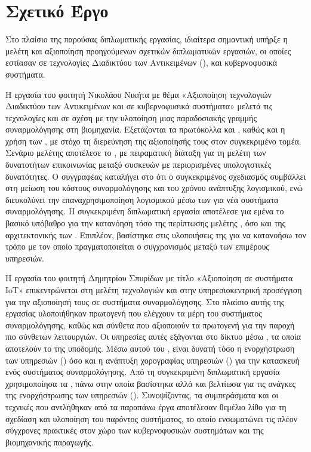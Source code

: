\section{Σχετικό Έργο}
Στο πλαίσιο της παρούσας διπλωματικής εργασίας, ιδιαίτερα σημαντική υπήρξε η μελέτη και αξιοποίηση προηγούμενων
σχετικών διπλωματικών εργασιών, οι οποίες εστίασαν σε τεχνολογίες Διαδικτύου των Αντικειμένων (),
 και κυβερνοφυσικά συστήματα.

Η εργασία του φοιτητή Νικολάου Νικήτα με θέμα «Αξιοποίηση τεχνολογιών Διαδικτύου των Αντικειμένων και 
σε κυβερνοφυσικά συστήματα» μελετά τις τεχνολογίες  και  σε σχέση με την υλοποίηση μιας παραδοσιακής
γραμμής συναρμολόγησης στη βιομηχανία. Εξετάζονται τα πρωτόκολλα  και , καθώς και η χρήση
των , με στόχο τη διερεύνηση της αξιοποίησής τους στον συγκεκριμένο τομέα. Σενάριο μελέτης
αποτέλεσε το , με πειραματική διάταξη για τη μελέτη των δυνατοτήτων επικοινωνίας
μεταξύ συσκευών με περιορισμένες υπολογιστικές δυνατότητες. Ο συγγραφέας καταλήγει στο ότι ο συγκεκριμένος σχεδιασμός
συμβάλλει στη μείωση του κόστους συναρμολόγησης και του χρόνου ανάπτυξης λογισμικού, ενώ διευκολύνει την
επαναχρησιμοποίηση λογισμικού μέσω των  για νέα συστήματα συναρμολόγησης.
Η συγκεκριμένη διπλωματική εργασία αποτέλεσε για εμένα το βασικό υπόβαθρο για την κατανόηση τόσο της περίπτωσης μελέτης
, όσο και της αρχιτεκτονικής των . Επιπλέον, βασίστηκα στις υλοποιήσεις της για να κατανοήσω
τον τρόπο με τον οποίο πραγματοποιείται ο συγχρονισμός μεταξύ των επιμέρους υπηρεσιών.

Η εργασία του φοιτητή Δημητρίου Σπυρίδων με τίτλο «Αξιοποίηση  σε συστήματα IoT»
επικεντρώνεται στη μελέτη τεχνολογιών  και στην υπηρεσιοκεντρική προσέγγιση για την αξιοποίησή τους σε
συστήματα συναρμολόγησης. Στο πλαίσιο αυτής της εργασίας υλοποιήθηκαν πρωτογενή  που
ελέγχουν τα μέρη του συστήματος συναρμολόγησης, καθώς και σύνθετα  που αξιοποιούν
τα πρωτογενή για την παροχή πιο σύνθετων λειτουργιών. Οι υπηρεσίες αυτές εξάγονται στο δίκτυο μέσω  ,
τα οποία αποτελούν το  της υποδομής. Μέσω αυτού του , είναι δυνατή τόσο η ενορχήστρωση των
υπηρεσιών () όσο και η ανάπτυξη χορογραφίας υπηρεσιών ()
για την κατασκευή ενός συστήματος συναρμολόγησης. Από τη συγκεκριμένη διπλωματική εργασία χρησιμοποίησα τα ,
πάνω στην οποία βασίστηκα αλλά και βελτίωσα για τις ανάγκες της
ενορχήστρωσης των υπηρεσιών ().
Συνοψίζοντας, τα συμπεράσματα και οι τεχνικές που αντλήθηκαν από τα παραπάνω έργα αποτέλεσαν θεμέλιο λίθο
για τη σχεδίαση και υλοποίηση του παρόντος συστήματος, το οποίο ενσωματώνει τις
πλέον σύγχρονες πρακτικές στον χώρο των κυβερνοφυσικών συστημάτων και της βιομηχανικής παραγωγής.

